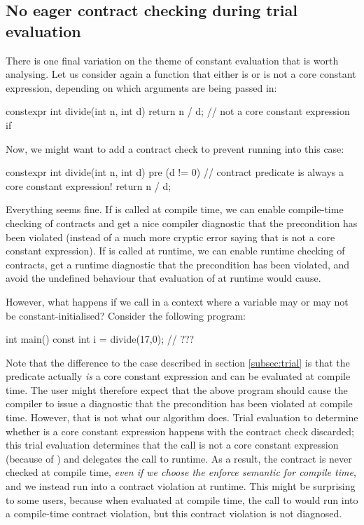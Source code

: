 
\subsection{No eager contract checking during trial evaluation}

There is one final variation on the theme of constant evaluation that is worth analysing. Let us consider again a  function that either is or is not a core constant expression, depending on which arguments are being passed in:

\begin{codeblock}
constexpr int divide(int n, int d) {
  return n / d;   // not a core constant expression if 
}
\end{codeblock}

Now, we might want to add a contract check to prevent running into this case:

\begin{codeblock}
constexpr int divide(int n, int d)
  pre (d != 0) {  // contract predicate is always a core constant expression!
  return n / d; 
}
\end{codeblock}

Everything seems fine. If  is called at compile time, we can enable compile-time checking of contracts and get a nice compiler diagnostic that the precondition has been violated (instead of a much more cryptic error saying that  is not a core constant expression). If  is called at runtime, we can enable runtime checking of contracts, get a runtime diagnostic that the precondition has been violated, and avoid the undefined behaviour that evaluation of  at runtime would cause.

However, what happens if we call  in a context where a variable may or may not be constant-initialised? Consider the following program:

\begin{codeblock}
int main() {
  const int i = divide(17,0);   // ???
}
\end{codeblock}

Note that the difference to the case described in section \ref{subsec:trial} is that the predicate actually \emph{is} a core constant expression and can be evaluated at compile time. The user might therefore expect that the above program should cause the compiler to issue a diagnostic that the precondition has been violated at compile time. However, that is not what our algorithm does. Trial evaluation to determine whether  is a core constant expression happens with the contract check discarded; this trial evaluation determines that the call is not a core constant expression (because of ) and delegates the call to runtime. As a result, the contract is never checked at compile time, \emph{even if we choose the enforce semantic for compile time}, and we instead run into a contract violation at runtime. This might be surprising to some users, because when evaluated at compile time, the call to  would run into a compile-time contract violation, but this contract violation is not diagnosed.

